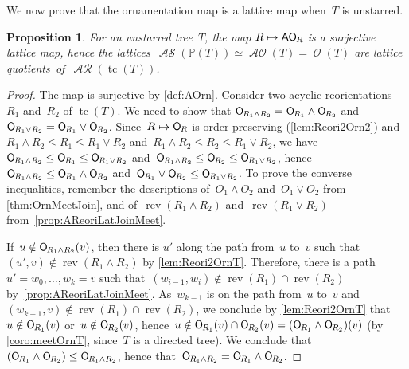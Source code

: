 \documentclass{amsart}
\newtheorem{proposition}[theorem]{Proposition}
\theoremstyle{definition}
\renewcommand{\c}[1]{\mathcal{#1}} %
\DeclareMathOperator{\tc}{tc} %
\newcommand{\meet}{\wedge} %
\newcommand{\join}{\vee} %
\newcommand{\mymap}[2]{\mathsf{#1}_{\hspace{-.7pt}#2}}
\DeclareMathOperator{\Orn}{\c{O}}  %
\newcommand{\orn}[1]{\mymap{O}{#1}}  %
\DeclareMathOperator{\AOrn}{\c{AO}}  %
\newcommand{\aorn}[1]{\mymap{AO}{#1}}  %
\DeclareMathOperator{\AReori}{\c{AR}}  %
\DeclareMathOperator{\rev}{rev} %
\DeclareMathOperator{\ASour}{\mathcal{AS}}  %
\newcommand{\PP}{\mathbb P} %
\begin{document}
We now prove that the ornamentation map is a lattice map when~$T$ is unstarred.

\begin{proposition}
\label{prop:AReori2AOrnLatticeMapUT}
For an unstarred tree~$T$, the map $R \mapsto \aorn{R}$ is a surjective lattice map, hence the lattices~$\ASour(\PP(T)) \simeq \AOrn(T) = \Orn(T)$ are lattice quotients~of~$\AReori(\tc(T))$.
\end{proposition}

\begin{proof}
The map is surjective by \cref{def:AOrn}.
Consider two acyclic reorientations~$R_1$ and~$R_2$ of $\tc(T)$.
We need to show that ${\orn{R_1 \meet R_2} = \orn{R_1} \meet \orn{R_2}}$ and~$\orn{R_1 \join R_2} = \orn{R_1} \join \orn{R_2}$.
Since~$R \mapsto \orn{R}$ is order-preserving (\cref{lem:Reori2Orn2}) and~$R_1 \meet R_2 \le R_1 \le R_1 \join R_2$ and~$R_1 \meet R_2 \le R_2 \le R_1 \join R_2$, we have~$\orn{R_1 \meet R_2} \le \orn{R_1} \le \orn{R_1 \join R_2}$ and~$\orn{R_1 \meet R_2} \le \orn{R_2} \le \orn{R_1 \join R_2}$, hence~${\orn{R_1 \meet R_2} \le \orn{R_1} \meet \orn{R_2}}$ and~${\orn{R_1} \join \orn{R_2} \le \orn{R_1 \join R_2}}$.
To prove the converse inequalities, remember the descriptions of~${O_1 \meet O_2}$ and~${O_1 \join O_2}$ from \cref{thm:OrnMeetJoin}, and of~$\rev(R_1 \meet R_2)$ and~$\rev(R_1 \join R_2)$ from~\cref{prop:AReoriLatJoinMeet}.

If~$u \notin \orn{R_1 \meet R_2}(v)$, then there is $u'$ along the path from~$u$ to~$v$ such that~$(u',v) \notin \rev(R_1 \meet R_2)$ by \cref{lem:Reori2OrnT}.
Therefore, there is a path~$u' = w_0, \dots, w_k = v$ such that~$(w_{i-1}, w_i) \notin \rev(R_1) \cap \rev(R_2)$ by~\cref{prop:AReoriLatJoinMeet}.
As~$w_{k-1}$ is on the path from~$u$ to~$v$ and~$(w_{k-1},v) \notin \rev(R_1) \cap \rev(R_2)$, we conclude by \cref{lem:Reori2OrnT} that~$u \notin \orn{R_1}(v)$ or~$u \notin \orn{R_2}(v)$, hence~$u \notin \orn{R_1}(v) \cap \orn{R_2}(v) = (\orn{R_1} \meet \orn{R_2})(v)$ (by \cref{coro:meetOrnT}, since~$T$ is a directed tree).
We conclude that~$(\orn{R_1} \meet \orn{R_2}) \le \orn{R_1 \meet R_2}$, hence that~$\orn{R_1 \meet R_2} = \orn{R_1} \meet \orn{R_2}$.


\end{proof}
\end{document}
